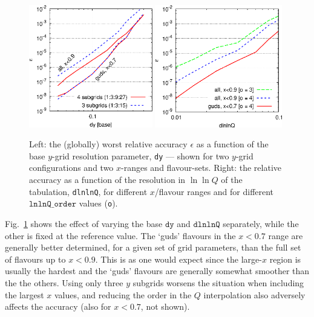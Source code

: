 \documentclass[12pt]{article}
\newcommand{\dy}{\ttt{dy}}
\newcommand{\dlnlnQ}{\ttt{dlnlnQ}}
\newcommand{\ttt}[1]{\texttt{#1}}
\begin{document}
\begin{figure}
  \centering
  \includegraphics[width=0.48\textwidth]{../benchmarking/test_acc/dy.eps}%
  \hfill
  \includegraphics[width=0.495\textwidth]{../benchmarking/test_acc/dlnlnQ.eps}%
  \caption{Left: the (globally) worst relative accuracy $\epsilon$ as
    a function of the base $y$-grid resolution parameter, \ttt{dy} ---
    shown for two $y$-grid configurations and two $x$-ranges and
    flavour-sets.  Right: the relative accuracy as a function of the
    resolution in $\ln \ln Q$ of the tabulation, \ttt{dlnlnQ}, for
    different $x$/flavour ranges and for different $\ttt{lnlnQ\_order}$
    values (\ttt{o}).}
  \label{fig:dy+dlnlnQ}
\end{figure}

Fig.~\ref{fig:dy+dlnlnQ} shows the effect of varying the base $\dy$
and $\dlnlnQ$ separately, while the other is fixed at the reference
value. The `guds' flavours in the $x<0.7$ range are generally better
determined, for a given set of grid parameters, than the full set of
flavours up to $x<0.9$. This is as one would expect since the
large-$x$ region is usually the hardest and the `guds' flavours are
generally somewhat smoother than the the others. Using only three $y$
subgrids worsens the situation when including the largest $x$ values,
and reducing the order in the $Q$ interpolation also adversely affects
the accuracy (also for $x<0.7$, not shown).
\end{document}

